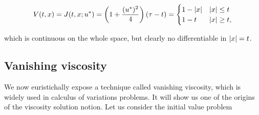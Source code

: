 








\begin{equation}\label{Non diff V-V}V(t,x)=J(t,x;u^{\ast}) = \left(1+\frac{(u^{\ast})^2}{4}\right)(\tau - t) = \begin{cases}
    1-\abs{x} & \abs{x}\leq t \\
    1-t& \abs{x}\geq t,
\end{cases}\end{equation}

which is continuous on the whole space, but clearly no differentiable in $\abs{x}=t$.

\subsection{Vanishing viscosity}

We now euristichally expose a technique called vanishing viscosity, which is widely used in 
calculus of variations problems. It will show us one of the origins of the viscosity 
solution notion. Let us consider the initial value problem

